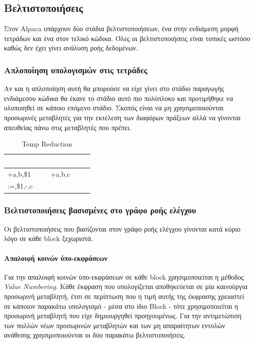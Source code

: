 \documentclass[12pt]{article}
\begin{document}
\subsection{Βελτιστοποιήσεις}
Στον Alpaca υπάρχουν δύο στάδια βελτιστοποιήσεων, ένα στην ενδιάμεση μορφή τετράδων και ένα στον τελικό κώδικα. Όλες οι βελτιστοποιήσεις είναι τοπικές ωστόσο καθώς δεν έχει γίνει ανάλυση ροής δεδομένων.
\subsubsection{Απλοποίηση υπολογισμών στις τετράδες}
Αν και η απλοποίηση αυτή θα μπορούσε να είχε γίνει στο στάδιο παραγωγής ενδιάμεσου κώδικα θα έκανε το στάδιο αυτό πιο πολύπλοκο και προτιμήθηκε να υλοποιηθεί σε κάποιο επόμενο στάδιο. Σκοπός είναι να μη χρησιμοποιούνται προσωρινές μεταβλητές για την εκτέλεση των διαφόρων πράξεων αλλά να γίνονται απευθείας πάνω στις μεταβλητές που πρέπει.

\begin{table}
\centering
\begin{tabular}{|l|l|}
\hline
   \rowcolor{ablack}
    \textcolor{white}{Generated} & \textcolor{white}{Optimized} \\ \hline
    
    \rowcolor{gray}  
    +a,b,\$1 & +a,b,c \\ 
    \rowcolor{gray}    
    :=,\$1,-,c & \\
    
\hline
\end{tabular}
\caption{Temp Reduction}
\end{table}
\subsubsection{Βελτιστοποιήσεις βασισμένες στο γράφο ροής ελέγχου}
Οι βελτιστοποιήσεις που βασίζονται στον γράφο ροής ελέγχου γίνονται κατά κύριο λόγο σε κάθε block ξεχωριστά.
\paragraph{Απαλοιφή κοινών ύπο-εκφράσεων}
Για την απαλοιφή κοινών ύπο-εκφράσεων σε κάθε block χρησιμοποιείται η μέθοδος \textit{Value Numbering}. Κάθε έκφραση που υπολογίζεται αποθηκεύεται σε μία καινούργια προσωρινή μεταβλητή, έτσι σε περίπτωση που η τιμή αυτής της έκφρασης χρειαστεί σε κάποιον παρακάτω υπολογισμό - μέσα στο ίδιο Block - τότε χρησιμοποιείται η  προσωρινή μεταβλητή που είχε δημιουργηθεί προηγουμένως. Για την αντιμετώπιση των πολλών νέων προσωρινών μεταβλητών και των μη απαραίτητων εντολών ανάθεσης χρησιμοποιούνται οι δύο παρακάτω βελτιστοποιήσεις.
\end{document}
